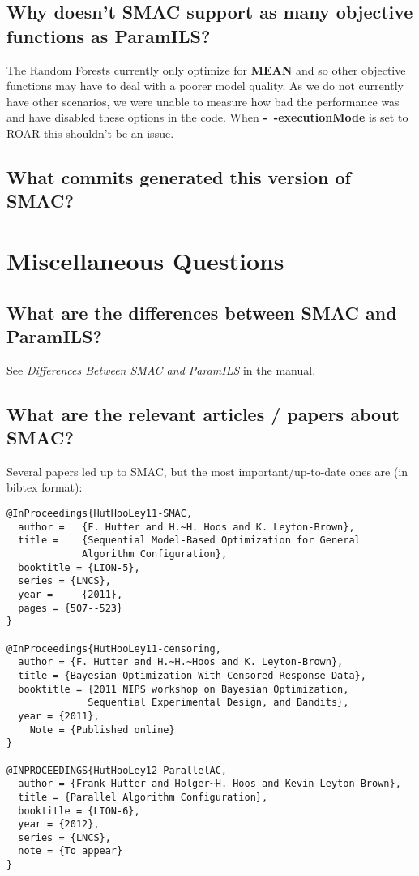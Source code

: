\documentclass[11pt,letterpaper,oneside]{article}
\begin{document}
\subsection{Why doesn't SMAC support as many objective functions as ParamILS?}
\label{sec:rf-objectives}

	The Random Forests currently only optimize for \textbf{MEAN} and so other objective functions may have to deal with a poorer model quality. As we do not currently have other scenarios, we were unable to measure how bad the performance was and have disabled these options in the code. When \textbf{-~$\!$-executionMode} is set to ROAR this shouldn't be an issue.

\subsection{What commits generated this version of SMAC?}



\section{Miscellaneous Questions}

\subsection{What are the differences between SMAC and ParamILS?}

	See \emph{Differences Between SMAC and ParamILS} in the manual.


\subsection{What are the relevant articles / papers about SMAC?}

Several papers led up to SMAC, but the most important/up-to-date ones are (in bibtex format):
\begin{verbatim}
@InProceedings{HutHooLey11-SMAC,
  author =	 {F. Hutter and H.~H. Hoos and K. Leyton-Brown},
  title =	 {Sequential Model-Based Optimization for General 
             Algorithm Configuration},
  booktitle = {LION-5},
  series = {LNCS},
  year =	 {2011},
  pages = {507--523}
}

@InProceedings{HutHooLey11-censoring,
  author = {F. Hutter and H.~H.~Hoos and K. Leyton-Brown},
  title = {Bayesian Optimization With Censored Response Data},
  booktitle = {2011 NIPS workshop on Bayesian Optimization, 
              Sequential Experimental Design, and Bandits},
  year = {2011},
	Note = {Published online}
}

@INPROCEEDINGS{HutHooLey12-ParallelAC,
  author = {Frank Hutter and Holger~H. Hoos and Kevin Leyton-Brown},
  title = {Parallel Algorithm Configuration},
  booktitle = {LION-6},
  year = {2012},
  series = {LNCS},
  note = {To appear}
}
\end{verbatim}
\end{document}
